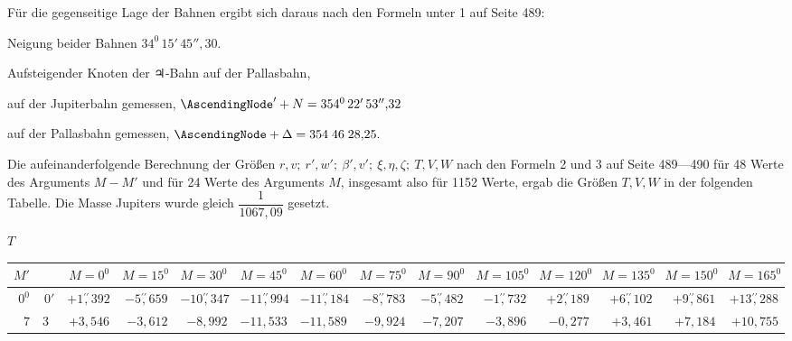 \begin{landscape}
\begin{center}
\begin{tabular}{@{}lcc@{}}
\end{tabular}
\end{center}
\endgroup
\par\noindent Für die gegenseitige Lage der Bahnen ergibt sich daraus nach den Formeln unter 1 auf Seite 489:
\begin{center}
Neigung beider Bahnen \(34^0\,15'\,45''{,}30.\)
\end{center}
\noindent Aufsteigender Knoten der {\mdseries\AstroSymbols ♃}-Bahn auf der Pallasbahn,\par\nobreak
\noindent\hfill auf der Jupiterbahn gemessen, \(\AscendingNode'+N=354^0\,22'\,53''{,}32\)\par\nobreak
\noindent\hfill auf der Pallasbahn gemessen, \(\AscendingNode+\Delta=354\;46\;28{,}25.\)
\par\noindent\hspace*{\parindent}Die aufeinanderfolgende Berechnung der Größen \(r,v;\ r',w';\ \beta',v';\ \xi,\eta,\zeta;\ T,V,W\) nach den Formeln 2 und 3 auf Seite 489---490 für 48 Werte des Arguments \(M-M'\) und für 24 Werte des Arguments \(M\), insgesamt also für 1152 Werte, ergab die Größen \(T,V,W\) in der folgenden Tabelle. Die Masse Jupiters wurde gleich \(\dfrac{1}{1067{,}09}\) gesetzt.
\par{}
\clearpage
\clearpage
\begingroup
\fontsize{8.5}{10.5}\selectfont
{}
\renewcommand{\headrulewidth}{0pt}
\begin{center}\(T\)\end{center}
\setlength{\tabcolsep}{2.5pt}
\renewcommand{\arraystretch}{1.08}
\begin{longtable}{@{}rr|r|r|r|r|r|r|r|r|r|r|r|r@{}}
\hline
\(M'\) & & \(M=0^0\) & \(M=15^0\) & \(M=30^0\) & \(M=45^0\) & \(M=60^0\) & \(M=75^0\) & \(M=90^0\) & \(M=105^0\) & \(M=120^0\) & \(M=135^0\) & \(M=150^0\) & \(M=165^0\)\\
\hline
\endhead
\(0^0\) & \(0'\) & \(+1\overset{\prime\prime}{,}392\) & \(-5\overset{\prime\prime}{,}659\) & \(-10\overset{\prime\prime}{,}347\) & \(-11\overset{\prime\prime}{,}994\) & \(-11\overset{\prime\prime}{,}184\) & \(-8\overset{\prime\prime}{,}783\) & \(-5\overset{\prime\prime}{,}482\) & \(-1\overset{\prime\prime}{,}732\) & \(+2\overset{\prime\prime}{,}189\) & \(+6\overset{\prime\prime}{,}102\) & \(+9\overset{\prime\prime}{,}861\) & \(+13\overset{\prime\prime}{,}288\)\\
\(7\) & \(30\) & \(+3{,}546\) & \(-3{,}612\) & \(-8{,}992\) & \(-11{,}533\) & \(-11{,}589\) & \(-9{,}924\) & \(-7{,}207\) & \(-3{,}896\) & \(-0{,}277\) & \(+3{,}461\) & \(+7{,}184\) & \(+10{,}755\)\\

\end{longtable}
\end{landscape}
